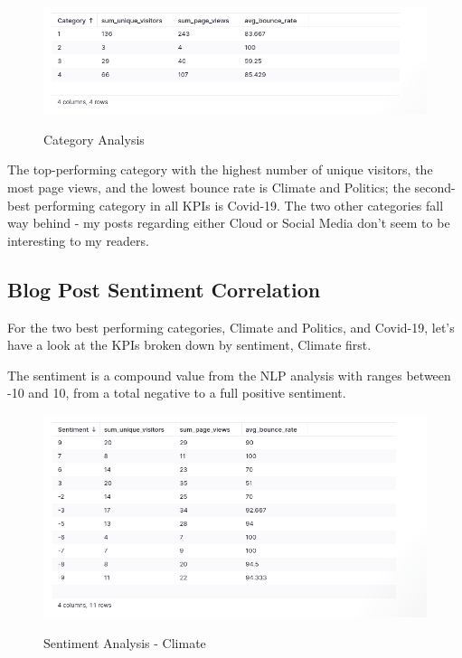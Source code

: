 \begin{figure}[H]
\centering
\caption {Category Analysis}
\includegraphics[width=\linewidth]{images/analysis-category.png}
\label{fig:analysisCategory}
\end{figure}

The top-performing category with the highest number of unique visitors, the most page views, and the lowest bounce rate is Climate and Politics; the second-best performing category in all KPIs is Covid-19. The two other categories fall way behind - my posts regarding either Cloud or Social Media don't seem to be interesting to my readers.

\subsection{Blog Post Sentiment Correlation}

For the two best performing categories, Climate and Politics, and Covid-19, let's have a look at the KPIs broken down by sentiment, Climate first.

The sentiment is a compound value from the NLP analysis with ranges between -10 and 10, from a total negative to a full positive sentiment.

\begin{figure}[H]
\centering
\caption {Sentiment Analysis - Climate}
\includegraphics[width=\linewidth]{images/analysis-sentiment-climate.png}
\label{fig:sentimentClimate}
\end{figure}

